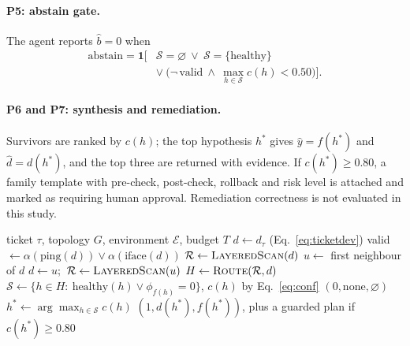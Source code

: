 \documentclass[pdflatex,sn-basic,Numbered,iicol]{sn-jnl}
\begin{document}
\paragraph{P5: abstain gate.} The agent reports $\hat b=0$ when
\begin{equation}
\begin{split}\text{abstain}=\mathbf{1}\Big[&\mathcal{S}=\varnothing\ \vee\ \mathcal{S}=\{\text{healthy}\}\\&\vee\ \big(\neg\,\text{valid}\ \wedge\ \max_{h\in\mathcal{S}}c(h)<0.50\big)\Big].\end{split}
\label{eq:abstain}
\end{equation}

\paragraph{P6 and P7: synthesis and remediation.} Survivors are ranked by $c(h)$; the top hypothesis $h^{*}$ gives $\hat y=f(h^{*})$ and $\hat d=d(h^{*})$, and the top three are returned with evidence. If $c(h^{*})\ge 0.80$, a family template with pre-check, post-check, rollback and risk level is attached and marked as requiring human approval. Remediation correctness is not evaluated in this study.

\begin{algorithm}[t]
\caption{Abstention-aware phase-gated troubleshooting}\label{alg:agent}
\raggedright\small
\begin{algorithmic}[1]
\Require ticket $\tau$, topology $G$, environment $\mathcal{E}$, budget $T$
\State $d\leftarrow d_\tau$ (Eq.~\ref{eq:ticketdev})
\State valid $\leftarrow\alpha(\text{ping}(d))\vee\alpha(\text{iface}(d))$
\State $\mathcal{R}\leftarrow\textsc{LayeredScan}(d)$
  \State $u\leftarrow$ first neighbour of $d$
    \State $d\leftarrow u$;\ $\mathcal{R}\leftarrow\textsc{LayeredScan}(u)$
  \EndIf
\EndIf
\State $H\leftarrow\textsc{Route}(\mathcal{R},d)$ 
\State $\mathcal{S}\leftarrow\{h\in H:\ \text{healthy}(h)\vee\phi_{f(h)}=0\}$, $c(h)$ by Eq.~\ref{eq:conf}
  \State \Return $(0,\text{none},\varnothing)$
\EndIf
\State $h^{*}\leftarrow\arg\max_{h\in\mathcal{S}}c(h)$
\State \Return $(1,d(h^{*}),f(h^{*}))$, plus a guarded plan if $c(h^{*})\ge0.80$
\end{algorithmic}
\end{algorithm}
\end{document}
